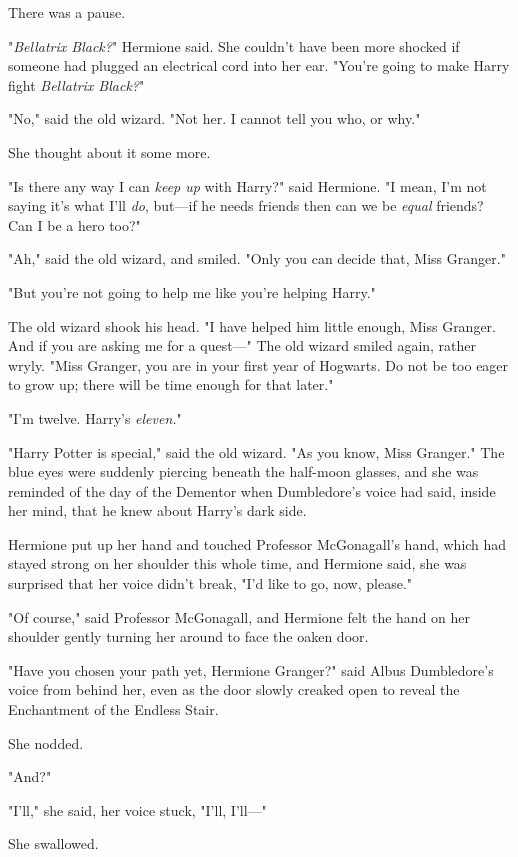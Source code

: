There was a pause.

"\emph{Bellatrix Black?}" Hermione said. She couldn't have been more shocked if 
someone had plugged an electrical cord into her ear. "You're going to make 
Harry fight \emph{Bellatrix Black?}"

"No," said the old wizard. "Not her. I cannot tell you who, or why."

She thought about it some more.

"Is there any way I can \emph{keep up} with Harry?" said Hermione. "I mean, I'm 
not saying it's what I'll \emph{do}, but---if he needs friends then can we be 
\emph{equal} friends? Can I be a hero too?"

"Ah," said the old wizard, and smiled. "Only you can decide that, Miss Granger."

"But you're not going to help me like you're helping Harry."

The old wizard shook his head. "I have helped him little enough, Miss Granger. 
And if you are asking me for a quest---" The old wizard smiled again, rather 
wryly. "Miss Granger, you are in your first year of Hogwarts. Do not be too 
eager to grow up; there will be time enough for that later."

"I'm twelve. Harry's \emph{eleven.}"

"Harry Potter is special," said the old wizard. "As you know, Miss Granger." 
The blue eyes were suddenly piercing beneath the half-moon glasses, and she was 
reminded of the day of the Dementor when Dumbledore's voice had said, inside 
her mind, that he knew about Harry's dark side.

Hermione put up her hand and touched Professor McGonagall's hand, which had 
stayed strong on her shoulder this whole time, and Hermione said, she was 
surprised that her voice didn't break, "I'd like to go, now, please."

"Of course," said Professor McGonagall, and Hermione felt the hand on her 
shoulder gently turning her around to face the oaken door.

"Have you chosen your path yet, Hermione Granger?" said Albus Dumbledore's 
voice from behind her, even as the door slowly creaked open to reveal the 
Enchantment of the Endless Stair.

She nodded.

"And?"

"I'll," she said, her voice stuck, "I'll, I'll---"

She swallowed.

